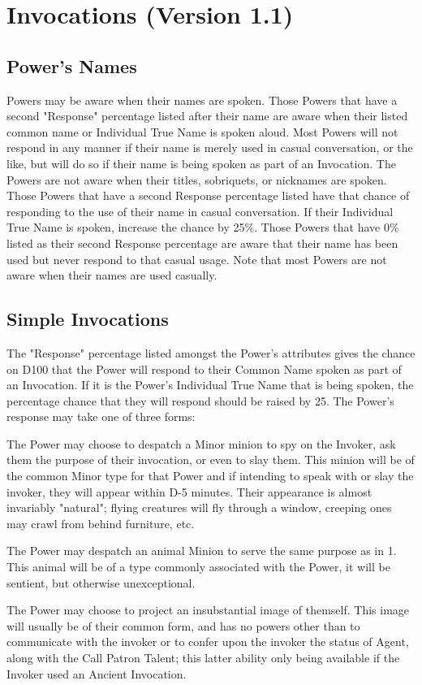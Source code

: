 \section{Invocations (Version 1.1)}

\subsection{Power's Names}

Powers may be aware when their names are spoken.  Those Powers that
have a second "Response" percentage listed after their name are aware
when their listed common name or Individual True Name is spoken aloud.
Most Powers will not respond in any manner if their name is merely
used in casual conversation, or the like, but will do so if their name
is being spoken as part of an Invocation.  The Powers are not aware
when their titles, sobriquets, or nicknames are spoken.  Those Powers
that have a second Response percentage listed have that chance of
responding to the use of their name in casual conversation.  If their
Individual True Name is spoken, increase the chance by 25\%.  Those
Powers that have 0\% listed as their second Response percentage are
aware that their name has been used but never respond to that casual
usage.  Note that most Powers are not aware when their names are used
casually.

\subsection{Simple Invocations}

The "Response" percentage listed amongst the Power's attributes gives
the chance on D100 that the Power will respond to their Common Name
spoken as part of an Invocation.  If it is the Power's Individual True
Name that is being spoken, the percentage chance that they will
respond should be raised by 25.  The Power's response may take one of
three forms:
\begin{Enumerate}

\item
The Power may choose to despatch a Minor minion to spy on the Invoker,
ask them the purpose of their invocation, or even to slay them.  This
minion will be of the common Minor type for that Power and if
intending to speak with or slay the invoker, they will appear within
D-5 minutes.  Their appearance is almost invariably "natural"; flying
creatures will fly through a window, creeping ones may crawl from
behind furniture, etc.

\item
The Power may despatch an animal Minion to serve the same purpose as
in 1.  This animal will be of a type commonly associated with the
Power, it will be sentient, but otherwise unexceptional.

\item
The Power may choose to project an insubstantial image of themself.
This image will usually be of their common form, and has no powers
other than to communicate with the invoker or to confer upon the
invoker the status of Agent, along with the Call Patron Talent; this
latter ability only being available if the Invoker used an Ancient
Invocation.
\end{Enumerate}

